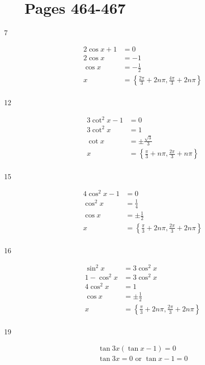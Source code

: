 \documentclass[fleqn,addpoints]{exam}
\begin{document}
\begin{description}

\section{Pages 464-467}

\item[7] 
\begin{align*}
  2 \cos x + 1 &= 0 \\  
  2 \cos x &= -1 \\  
  \cos x  &= - \frac{1}{2} \\  
  x &= \left\{ \frac{2 \pi}{3} + 2n \pi, \frac{4 \pi}{3} + 2n \pi \right\} \\
\end{align*}

\item[12] 
\begin{align*}
  3 \cot^2 x - 1 &= 0 \\    
  3 \cot^2 x &= 1 \\  
  \cot x &= \pm \frac{\sqrt{3}}{3} \\  
  x &= \left\{ \frac{\pi}{3} + n \pi, \frac{2 \pi}{3} + n \pi \right\} \\
\end{align*}

\item[15] 
\begin{align*}
  4 \cos^2 x - 1 &= 0 \\  
  \cos^2 x &= \frac{1}{4} \\  
  \cos x &= \pm \frac{1}{2} \\  
  x &= \left\{ \frac{\pi}{3} + 2n \pi, \frac{2 \pi}{3} + 2n \pi \right\} \\
\end{align*}

\item[16] 
\begin{align*}
  \sin^2 x &= 3 \cos^2 x \\  
  1 - \cos^2 x &= 3 \cos^2 x \\  
  4 \cos^2 x &= 1 \\  
  \cos x &= \pm \frac{1}{2} \\  
  x &= \left\{ \frac{\pi}{3} + 2n \pi, \frac{2 \pi}{3} + 2n \pi \right\} \\
\end{align*}

\item[19] 
\begin{align*}
  \tan 3x ( \tan x - 1) = 0 \\ 
  \tan 3x = 0 \text{ or } \tan x - 1 = 0 \\
\end{align*}


\end{description}
\end{document}
